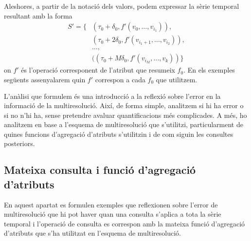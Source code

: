 \begin{definition}
  Aleshores, a partir de la notació dels valors, podem expressar la
  sèrie temporal resultant amb la forma
  \begin{align*}
    S'=\{& (\tau_0+\delta_0, f'(v_0,\dotsc,v_{i_1})),\\
    & (\tau_0+2\delta_0, f'(v_{i_1+1},\dotsc,v_{i_2})),\\
    & \dotsc,\\
    & ((\tau_0+M\delta_0 ,f'(v_{i_M},\dotsc, v_k)) \}
  \end{align*}
  on $f'$ és l'operació corresponent de l'atribut que resumeix
  $f_0$. En els exemples següents assenyalarem quin $f'$ correspon a
  cada $f_0$ que utilitzem.
\end{definition}



L'anàlisi que formulem és una introducció a la reflexió sobre l'error
en la informació de la multiresolució. Així, de forma simple,
analitzem si hi ha error o si no n'hi ha, sense pretendre avaluar
quantificacions més complicades. A més, ho analitzem en base a
l'esquema de multiresolució que s'utilitzi, particularment de quines
funcions d'agregació d'atributs s'utilitzin i de com siguin les
consultes posteriors.



\subsection{Mateixa consulta i funció d'agregació d'atributs}
\label{ex:multiresolucio:f=op}


En aquest apartat es formulen exemples que reflexionen sobre l'error
de multiresolució que hi pot haver quan una consulta s'aplica a tota
la sèrie temporal i l'operació de consulta es correspon amb la mateixa
funció d'agregació d'atributs que s'ha utilitzat en l'esquema de
multiresolució.




